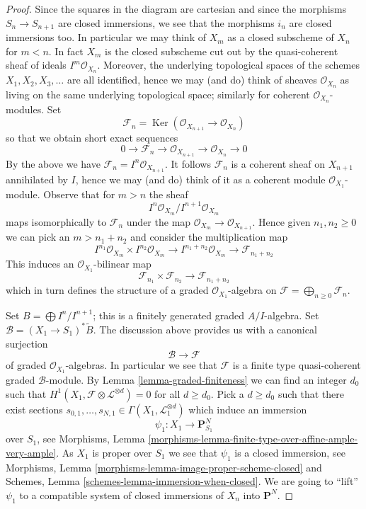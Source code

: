 \documentclass{stacks-project}
\theoremstyle{plain}
\theoremstyle{definition}
\theoremstyle{remark}
\numberwithin{equation}{subsection}
\def\Ker{\mathop{\mathrm{Ker}}}
\begin{document}
\begin{proof}
Since the squares in the diagram are cartesian and since the morphisms
$S_n \to S_{n + 1}$ are closed immersions, we see that the morphisms
$i_n$ are closed immersions too. In particular we may think of
$X_m$ as a closed subscheme of $X_n$ for $m < n$. In fact $X_m$ is
the closed subscheme cut out by the quasi-coherent sheaf of ideals
$I^m\mathcal{O}_{X_n}$. Moreover, the underlying topological spaces
of the schemes $X_1, X_2, X_3, \ldots$ are all identified, hence we
may (and do) think of sheaves $\mathcal{O}_{X_n}$ as living on the
same underlying topological space; similarly for coherent
$\mathcal{O}_{X_n}$-modules. Set
$$
\mathcal{F}_n =
\Ker(\mathcal{O}_{X_{n + 1}} \to \mathcal{O}_{X_n})
$$
so that we obtain short exact sequences
$$
0 \to \mathcal{F}_n \to \mathcal{O}_{X_{n + 1}} \to \mathcal{O}_{X_n} \to 0
$$
By the above we have $\mathcal{F}_n = I^n\mathcal{O}_{X_{n + 1}}$.
It follows $\mathcal{F}_n$ is a coherent sheaf on $X_{n + 1}$
annihilated by $I$, hence we may (and do) think of it as a coherent
module $\mathcal{O}_{X_1}$-module. Observe that for $m > n$ the sheaf
$$
I^n\mathcal{O}_{X_m}/I^{n + 1}\mathcal{O}_{X_m}
$$
maps isomorphically to $\mathcal{F}_n$ under the map
$\mathcal{O}_{X_m} \to \mathcal{O}_{X_{n + 1}}$. Hence given
$n_1, n_2 \geq 0$ we can pick an $m > n_1 + n_2$ and consider the
multiplication map
$$
I^{n_1}\mathcal{O}_{X_m} \times I^{n_2}\mathcal{O}_{X_m}
\longrightarrow
I^{n_1 + n_2}\mathcal{O}_{X_m} \to \mathcal{F}_{n_1 + n_2}
$$
This induces an $\mathcal{O}_{X_1}$-bilinear map
$$
\mathcal{F}_{n_1} \times \mathcal{F}_{n_2} \longrightarrow
\mathcal{F}_{n_1 + n_2}
$$
which in turn defines the structure of a graded $\mathcal{O}_{X_1}$-algebra
on $\mathcal{F} = \bigoplus_{n \geq 0} \mathcal{F}_n$.

\medskip\noindent
Set $B = \bigoplus I^n/I^{n + 1}$; this is a finitely generated
graded $A/I$-algebra. Set $\mathcal{B} = (X_1 \to S_1)^*\widetilde{B}$.
The discussion above provides us with a canonical surjection
$$
\mathcal{B} \longrightarrow \mathcal{F}
$$
of graded $\mathcal{O}_{X_1}$-algebras. In particular we see that
$\mathcal{F}$ is a finite type quasi-coherent graded $\mathcal{B}$-module.
By Lemma \ref{lemma-graded-finiteness} we can find an integer $d_0$
such that $H^1(X_1, \mathcal{F} \otimes \mathcal{L}^{\otimes d}) = 0$
for all $d \geq d_0$. Pick a $d \geq d_0$ such that there exist sections
$s_{0, 1}, \ldots, s_{N, 1} \in \Gamma(X_1, \mathcal{L}_1^{\otimes d})$
which induce an immersion
$$
\psi_1 : X_1 \to \mathbf{P}^N_{S_1}
$$
over $S_1$, see
Morphisms, Lemma \ref{morphisms-lemma-finite-type-over-affine-ample-very-ample}.
As $X_1$ is proper over $S_1$ we see that $\psi_1$
is a closed immersion, see
Morphisms, Lemma \ref{morphisms-lemma-image-proper-scheme-closed}
and
Schemes, Lemma \ref{schemes-lemma-immersion-when-closed}.
We are going to ``lift'' $\psi_1$ to a compatible system of
closed immersions of $X_n$ into $\mathbf{P}^N$.


\end{proof}
\end{document}
